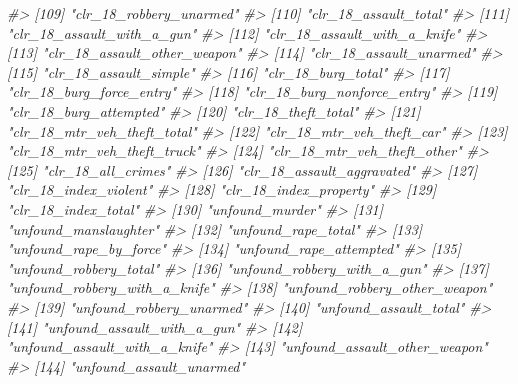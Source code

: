 \documentclass[
]{krantz}
\makeatletter
\newenvironment{Shaded}{\begin{snugshade}}{\end{snugshade}}
\newcommand{\CommentTok}[1]{\textcolor[rgb]{0.37,0.37,0.37}{\textit{#1}}}
\newenvironment{kframe}{%
\medskip{}
\setlength{\fboxsep}{.8em}
 \def\at@end@of@kframe{}%
 \ifinner\ifhmode%
  \def\at@end@of@kframe{\end{minipage}}%
  \begin{minipage}{\columnwidth}%
 \fi\fi%
 \def\FrameCommand##1{\hskip\@totalleftmargin \hskip-\fboxsep
 \colorbox{shadecolor}{##1}\hskip-\fboxsep
     \hskip-\linewidth \hskip-\@totalleftmargin \hskip\columnwidth}%
 \MakeFramed {\advance\hsize-\width
   \@totalleftmargin\z@ \linewidth\hsize
   \@setminipage}}%
 {\par\unskip\endMakeFramed%
 \at@end@of@kframe}
\renewenvironment{Shaded}{\begin{kframe}}{\end{kframe}}
\makeatother
\begin{document}
\begin{Shaded}
\begin{Highlighting}[]
\CommentTok{\#\textgreater{} [109] "clr\_18\_robbery\_unarmed"        }
\CommentTok{\#\textgreater{} [110] "clr\_18\_assault\_total"          }
\CommentTok{\#\textgreater{} [111] "clr\_18\_assault\_with\_a\_gun"     }
\CommentTok{\#\textgreater{} [112] "clr\_18\_assault\_with\_a\_knife"   }
\CommentTok{\#\textgreater{} [113] "clr\_18\_assault\_other\_weapon"   }
\CommentTok{\#\textgreater{} [114] "clr\_18\_assault\_unarmed"        }
\CommentTok{\#\textgreater{} [115] "clr\_18\_assault\_simple"         }
\CommentTok{\#\textgreater{} [116] "clr\_18\_burg\_total"             }
\CommentTok{\#\textgreater{} [117] "clr\_18\_burg\_force\_entry"       }
\CommentTok{\#\textgreater{} [118] "clr\_18\_burg\_nonforce\_entry"    }
\CommentTok{\#\textgreater{} [119] "clr\_18\_burg\_attempted"         }
\CommentTok{\#\textgreater{} [120] "clr\_18\_theft\_total"            }
\CommentTok{\#\textgreater{} [121] "clr\_18\_mtr\_veh\_theft\_total"    }
\CommentTok{\#\textgreater{} [122] "clr\_18\_mtr\_veh\_theft\_car"      }
\CommentTok{\#\textgreater{} [123] "clr\_18\_mtr\_veh\_theft\_truck"    }
\CommentTok{\#\textgreater{} [124] "clr\_18\_mtr\_veh\_theft\_other"    }
\CommentTok{\#\textgreater{} [125] "clr\_18\_all\_crimes"             }
\CommentTok{\#\textgreater{} [126] "clr\_18\_assault\_aggravated"     }
\CommentTok{\#\textgreater{} [127] "clr\_18\_index\_violent"          }
\CommentTok{\#\textgreater{} [128] "clr\_18\_index\_property"         }
\CommentTok{\#\textgreater{} [129] "clr\_18\_index\_total"            }
\CommentTok{\#\textgreater{} [130] "unfound\_murder"                }
\CommentTok{\#\textgreater{} [131] "unfound\_manslaughter"          }
\CommentTok{\#\textgreater{} [132] "unfound\_rape\_total"            }
\CommentTok{\#\textgreater{} [133] "unfound\_rape\_by\_force"         }
\CommentTok{\#\textgreater{} [134] "unfound\_rape\_attempted"        }
\CommentTok{\#\textgreater{} [135] "unfound\_robbery\_total"         }
\CommentTok{\#\textgreater{} [136] "unfound\_robbery\_with\_a\_gun"    }
\CommentTok{\#\textgreater{} [137] "unfound\_robbery\_with\_a\_knife"  }
\CommentTok{\#\textgreater{} [138] "unfound\_robbery\_other\_weapon"  }
\CommentTok{\#\textgreater{} [139] "unfound\_robbery\_unarmed"       }
\CommentTok{\#\textgreater{} [140] "unfound\_assault\_total"         }
\CommentTok{\#\textgreater{} [141] "unfound\_assault\_with\_a\_gun"    }
\CommentTok{\#\textgreater{} [142] "unfound\_assault\_with\_a\_knife"  }
\CommentTok{\#\textgreater{} [143] "unfound\_assault\_other\_weapon"  }
\CommentTok{\#\textgreater{} [144] "unfound\_assault\_unarmed"       }

\end{Highlighting}
\end{Shaded}
\end{document}
